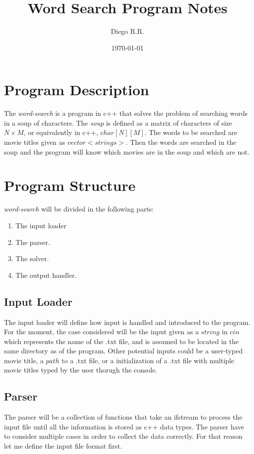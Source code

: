\documentclass{extarticle}
\author{Diego R.R.}
\title{Word Search Program Notes}
\date{\today}
\newcommand{\code}[1]{$#1$} %
\newcommand{\prgmtitle}{\textit{word-search}\xspace} %
\begin{document}
\maketitle

\section{Program Description}
The \prgmtitle is a program in c++ that solves the problem of searching words in a soup of characters. The \textit{soup} is defined as a matrix of characters of size $N \times M$, or equivalently in c++, \code{char[N][M]}. The words to be searched are movie titles given as \code{vector<strings>}. Then the words are searched in the soup and the program will know which movies are in the soup and which are not.

\section{Program Structure}
\prgmtitle will be divided in the following parts:
    \begin{enumerate}
        \item The input loader
        \item The parser.
        \item The solver.
        \item The output handler.
    \end{enumerate}

\subsection{Input Loader}
The input loader will define how input is handled and introduced to the program. For the moment, the case considered will be the input given as a \code{string} in \code{cin} which represents the name of the .txt file, and is assumed to be located in the same directory as of the program. Other potential inputs could be a user-typed movie title, a \code{path} to a .txt file, or a initialization of a .txt file with multiple movie titles typed by the user thorugh the console.

\subsection{Parser}
The parser will be a collection of functions that take an ifstream to process the input file until all the information is stored as c++ data types. The parser have to consider multiple cases in order to collect the data correctly. For that reason let me define the input file format first.
\end{document}
